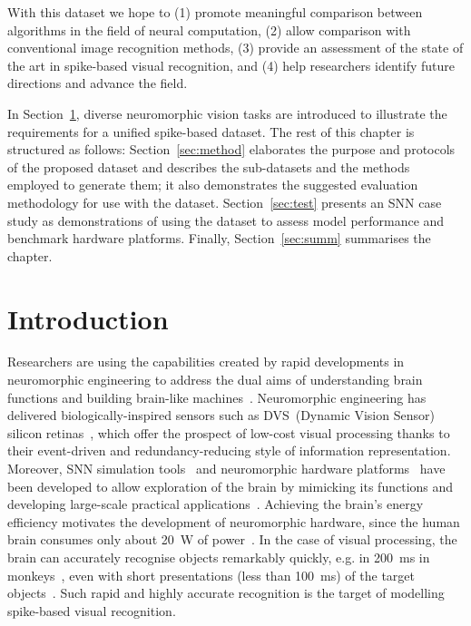 With this dataset we hope to (1) promote meaningful comparison between algorithms in the field of neural computation, (2) allow comparison with conventional image recognition methods, (3) provide an assessment of the state of the art in spike-based visual recognition, and (4) help researchers identify future directions and advance the field.

In Section~\ref{sec:chapt6_intro}, diverse neuromorphic vision tasks are introduced to illustrate the requirements for a unified spike-based dataset.
The rest of this chapter is structured as follows: Section~\ref{sec:method} elaborates the purpose and protocols of the proposed dataset and describes the sub-datasets and the methods employed to generate them; it also demonstrates the suggested evaluation methodology for use with the dataset.
Section~\ref{sec:test} presents an SNN case study as demonstrations of using the dataset to assess model performance and benchmark hardware platforms.
Finally, Section~\ref{sec:summ} summarises the chapter.

\section{Introduction}
\label{sec:chapt6_intro}
Researchers are using the capabilities created by rapid developments in neuromorphic engineering to address the dual aims of understanding brain functions and building brain-like machines~\cite{furber2007neural}.
Neuromorphic engineering has delivered biologically-inspired sensors such as DVS~(Dynamic Vision Sensor) silicon retinas~\cite{serrano2013128, delbruck2008frame, yang2015dynamic, posch2014retinomorphic}, which offer the prospect of low-cost visual processing thanks to their event-driven and redundancy-reducing style of information representation.
Moreover, SNN simulation tools~\cite{davison2008pynn, gewaltig2007nest, goodman2008brian} and neuromorphic hardware platforms~\cite{furber2014spinnaker,  schemmel2010wafer,benjamin2014neurogrid,merolla2014million} have been developed to allow exploration of the brain by mimicking its functions and developing large-scale practical applications~\cite{eliasmith2012large}.
Achieving the brain's energy efficiency motivates the development of neuromorphic hardware, since the human brain consumes only about 20~W of power~\cite{drubach2000brain}.
In the case of visual processing, the brain can accurately recognise objects remarkably quickly, e.g. in 200~ms in monkeys~\cite{fabre1998rapid}, even with short presentations (less than 100~ms) of the target objects~\cite{keysers2001speed}.
Such rapid and highly accurate recognition is the target of modelling spike-based visual recognition.



